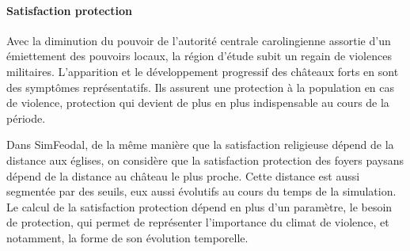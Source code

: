 \paragraph{Satisfaction \og protection\fg{}} \noindent 
Avec la diminution du pouvoir de l'autorité centrale carolingienne assortie d'un émiettement des pouvoirs locaux, la région d'étude subit un regain de violences militaires.
L'apparition et le développement progressif des châteaux forts en sont des symptômes représentatifs.
Ils assurent une protection à la population en cas de violence, protection qui devient de plus en plus indispensable au cours de la période.\\
\begin{tcolorbox}[breakable,left=0pt,right=0pt,top=0pt,bottom=0pt,
	colback=gray!15,colframe=gray!15,width=\dimexpr\textwidth\relax, 
	enlarge left by=0mm, boxsep=5pt,arc=0pt,outer arc=0pt]
	Dans SimFeodal, de la même manière que la satisfaction religieuse dépend de la distance aux églises, on considère que la satisfaction protection des foyers paysans dépend de la distance au château le plus proche.
	Cette distance est aussi segmentée par des seuils, eux aussi évolutifs au cours du temps de la simulation.
	Le calcul de la satisfaction protection dépend en plus d'un paramètre, le \og besoin de protection\fg{}, qui permet de représenter l'importance du climat de violence, et notamment, la forme de son évolution temporelle.
\end{tcolorbox}

